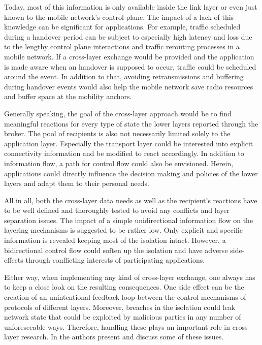 Today, most of this information is only available inside the link layer or even just known to the mobile network's control plane. The impact of a lack of this knowledge can be significant for applications. For example, traffic scheduled during a handover period can be subject to especially high latency and loss due to the lengthy control plane interactions and traffic rerouting processes in a mobile network. If a cross-layer exchange would be provided and the application is made aware when an handover is supposed to occur, traffic could be scheduled around the event. In addition to that, avoiding retransmissions and buffering during handover events would also help the mobile network save radio resources and buffer space at the mobility anchors.

Generally speaking, the goal of the cross-layer approach would be to find meaningful reactions for every type of state the lower layers reported through the broker. The pool of recipients is also not necessarily limited solely to the application layer. Especially the transport layer could be interested into explicit connectivity information and be modified to react accordingly. In addition to information flow, a path for control flow could also be envisioned. Herein, applications could directly influence the decision making and policies of the lower layers and adapt them to their personal needs.

All in all, both the cross-layer data needs as well as the recipient's reactions have to be well defined and thoroughly tested to avoid any conflicts and layer separation issues. The impact of a simple unidirectional information flow on the layering mechanisms is suggested to be rather low. Only explicit and specific information is revealed keeping most of the isolation intact. However, a bidirectional control flow could soften up the isolation and have adverse side-effects through conflicting interests of participating applications.

Either way, when implementing any kind of cross-layer exchange, one always has to keep a close look on the resulting consequences. One side effect can be the creation of an unintentional feedback loop between the control mechanisms of protocols of different layers. Moreover, breaches in the isolation could leak network state that could be exploited by malicious parties in any number of unforeseeable ways. Therefore, handling these plays an important role in cross-layer research. In \cite{1404568} the authors present and discuss some of these issues.


